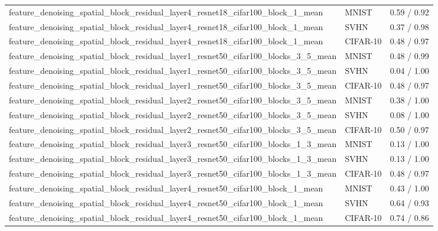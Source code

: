 \begin{tabular}{lll}
feature\_denoising\_spatial\_block\_residual\_layer4\_resnet18\_cifar100\_block\_1\_mean & MNIST & 0.59 / 0.92 \\
feature\_denoising\_spatial\_block\_residual\_layer4\_resnet18\_cifar100\_block\_1\_mean & SVHN & 0.37 / 0.98 \\
feature\_denoising\_spatial\_block\_residual\_layer4\_resnet18\_cifar100\_block\_1\_mean & CIFAR-10 & 0.48 / 0.97 \\
feature\_denoising\_spatial\_block\_residual\_layer1\_resnet50\_cifar100\_blocks\_3\_5\_mean & MNIST & 0.48 / 0.99 \\
feature\_denoising\_spatial\_block\_residual\_layer1\_resnet50\_cifar100\_blocks\_3\_5\_mean & SVHN & 0.04 / 1.00 \\
feature\_denoising\_spatial\_block\_residual\_layer1\_resnet50\_cifar100\_blocks\_3\_5\_mean & CIFAR-10 & 0.48 / 0.97 \\
feature\_denoising\_spatial\_block\_residual\_layer2\_resnet50\_cifar100\_blocks\_3\_5\_mean & MNIST & 0.38 / 1.00 \\
feature\_denoising\_spatial\_block\_residual\_layer2\_resnet50\_cifar100\_blocks\_3\_5\_mean & SVHN & 0.08 / 1.00 \\
feature\_denoising\_spatial\_block\_residual\_layer2\_resnet50\_cifar100\_blocks\_3\_5\_mean & CIFAR-10 & 0.50 / 0.97 \\
feature\_denoising\_spatial\_block\_residual\_layer3\_resnet50\_cifar100\_blocks\_1\_3\_mean & MNIST & 0.13 / 1.00 \\
feature\_denoising\_spatial\_block\_residual\_layer3\_resnet50\_cifar100\_blocks\_1\_3\_mean & SVHN & 0.13 / 1.00 \\
feature\_denoising\_spatial\_block\_residual\_layer3\_resnet50\_cifar100\_blocks\_1\_3\_mean & CIFAR-10 & 0.48 / 0.97 \\
feature\_denoising\_spatial\_block\_residual\_layer4\_resnet50\_cifar100\_block\_1\_mean & MNIST & 0.43 / 1.00 \\
feature\_denoising\_spatial\_block\_residual\_layer4\_resnet50\_cifar100\_block\_1\_mean & SVHN & 0.64 / 0.93 \\
feature\_denoising\_spatial\_block\_residual\_layer4\_resnet50\_cifar100\_block\_1\_mean & CIFAR-10 & 0.74 / 0.86 \\
\bottomrule
\end{tabular}
